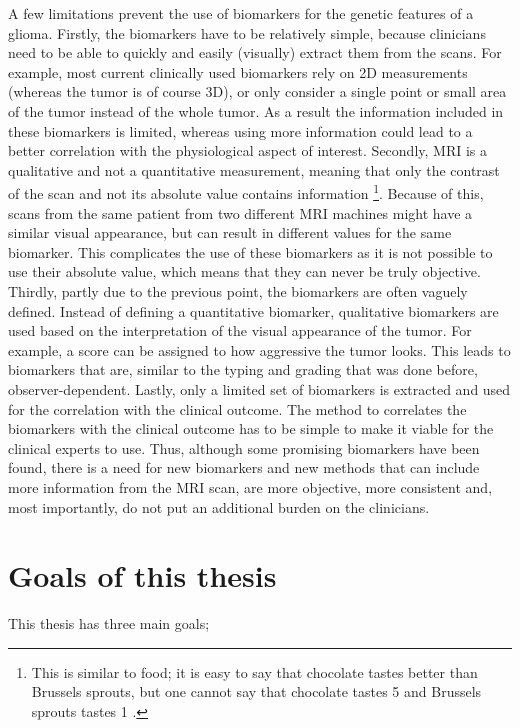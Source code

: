 A few limitations prevent the use of biomarkers for the genetic features of a \gls{glioma}.
Firstly, the biomarkers have to be relatively simple, because clinicians need to be able to quickly and easily (visually) extract them from the scans.
For example, most current clinically used biomarkers rely on 2D measurements (whereas the \gls{tumor} is of course 3D), or only consider a single point or small area of the \gls{tumor} instead of the whole \gls{tumor}.
As a result the information included in these biomarkers is limited, whereas using more information could lead to a better correlation with the physiological aspect of interest.
Secondly, \gls{MRI} is a qualitative and not a quantitative measurement, meaning that only the contrast of the scan and not its absolute value contains information \footnote{This is similar to food; it is easy to say that chocolate tastes better than Brussels sprouts, but one cannot say that chocolate tastes 5  and Brussels sprouts tastes 1 .}.
Because of this, scans from the same patient from two different \gls{MRI} machines might have a similar visual appearance, but can result in different values for the same biomarker.
This complicates the use of these biomarkers as it is not possible to use their absolute value, which means that they can never be truly objective.
Thirdly, partly due to the previous point, the biomarkers are often vaguely defined.
Instead of defining a quantitative biomarker, qualitative biomarkers are used based on the interpretation of the visual appearance of the \gls{tumor}.
For example, a score can be assigned to how aggressive the \gls{tumor} looks.
This leads to biomarkers that are, similar to the typing and grading that was done before, observer-dependent.
Lastly, only a limited set of biomarkers is extracted and used for the correlation with the clinical outcome.
The method to correlates the biomarkers with the clinical outcome has to be simple to make it viable for the clinical experts to use.
Thus, although some promising biomarkers have been found, there is a need for new biomarkers and new methods that can include more information from the \gls{MRI} scan, are more objective, more consistent and, most importantly, do not put an additional burden on the clinicians.


\section{Goals of this thesis}

This thesis has three main goals;

